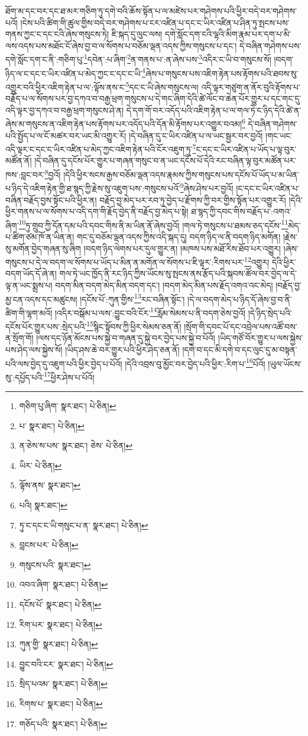 ཐོག་མ་དང་བར་དང་ཐ་མར་གཅིག་ཏུ་དགེ་བའི་ཆོས་སྟོན་པ་ལ་མཛེས་པར་གཤེགས་པའི་ཕྱིར་བདེ་བར་གཤེགས་པའོ། །ངེས་པའི་ཚིག་གི་ཚུལ་གྱིས་བདེ་བར་གཤེགས་པ་ངར་འཛིན་པ་དང་ང་ཡིར་འཛིན་པ་ཤིན་ཏུ་སྤངས་པས་གནས་ཀྱང་ང་དང་ངའི་ཞེས་གསུངས་ཏེ། ཇི་སྐད་དུ་ལུང་ལས། དགེ་སློང་དག་ངའི་ལྷའི་མིག་རྣམ་པར་དག་པ་མི་ལས་འདས་པས་མཐོང་ངོ་ཞེས་བྱ་བ་ལ་སོགས་པ་བཅོམ་ལྡན་འདས་ཀྱིས་གསུངས་པ་དང་། དེ་བཞིན་གཤེགས་པས་དགེ་སློང་དག་ང་ནི་:གཅིག་པུ་\footnote{གཅིག་པུ་ཞིག་  སྣར་ཐང་།  པེ་ཅིན། }དབེན་:པ་ཞིག་\footnote{པ་  སྣར་ཐང་།  པེ་ཅིན། }ན་གནས་པ་:ན་ཞེས་པས་\footnote{ན་ཅེས་ས་པས་  སྣར་ཐང་། ཅེས་  པེ་ཅིན། }འདིར་ང་ཡི་བ་གསུངས་སོ། །བདག་ཉིད་ལ་ང་དང་ང་ཡིར་འཛིན་པ་མེད་ཀྱང་ང་དང་ང་ཡི་\footnote{ཡིར་  པེ་ཅིན། }ཞེས་པ་གསུངས་པས་འཇིག་རྟེན་པས་རྟོགས་པའི་ཐབས་སུ་འགྱུར་བའི་ཕྱིར་འཇིག་རྟེན་པ་ལ་:ལྟོས་ནས་ང་\footnote{ལྟོས་ནས་  སྣར་ཐང་། }དང་ང་ཡི་ཞེས་གསུངས་ལ། འདི་ལྟར་གཙུག་ན་ནོར་བུའི་རྟོགས་པ་བརྗོད་པ་ལ་སོགས་པར་བྱ་དཀའ་བ་བརྒྱ་ཕྲག་གསུངས་པ་དེ་གང་ཞིག་དེའི་ཚེ་ལོང་བ་ཆེན་པོར་གྱུར་པ་དང་གང་དུ་འདི་ལྟར་བྱ་དཀའ་བ་བརྒྱ་ཕྲག་གསུངས་ཤེ་ན། དེ་དག་གོ་བར་འདོད་པའི་འཇིག་རྟེན་པ་ལ་གལ་ཏེ་ང་ཉིད་དེའི་ཚེ་ན་ཞེས་མ་གསུངས་ན་འཇིག་རྟེན་པས་རྟོགས་པར་འདོད་པའི་དོན་མི་རྟོགས་པར་འགྱུར་བའམ།\footnote{པའི།  སྣར་ཐང་། } དེ་བཞིན་གཤེགས་པའི་སྤྱོད་པ་ལ་ངོ་མཚར་བར་ཡང་མི་འགྱུར་རོ། །དེ་བཞིན་དུ་ང་ཡིར་འཛིན་པ་ལ་ཡང་སྦྱར་བར་བྱའོ། །གང་ཡང་འདི་ལྟར་ང་དང་ང་ཡིར་འཛིན་པ་མེད་ཀྱང་འཇིག་རྟེན་པའི་ངོར་འཇུག་ཏུ་\footnote{ཏུ་ང་དང་ང་ཡི་གསུང་པ་ན་  སྣར་ཐང་།  པེ་ཅིན། }ང་དང་ང་ཡིར་འཛིན་པ་ཡོད་པ་ལྟ་བུར་མཚོན་ནོ། །དེ་བཞིན་དུ་དངོས་པོར་གྱུར་པ་གཞན་གསུང་བ་ན་ཡང་དངོས་པོ་དེའི་རང་བཞིན་ལྟ་བུར་མཚོན་པར་ཁས་:བླང་བར་\footnote{བླངས་པར་  པེ་ཅིན། }བྱའོ། །དེའི་ཕྱིར་སངས་རྒྱས་བཅོམ་ལྡན་འདས་རྣམས་ཀྱིས་གསུངས་པས་དངོས་པོ་ཡོད་པ་མ་ཡིན་པ་ཉིད་དེ་འཇིག་རྟེན་གྱི་ཐ་སྙད་ཀྱི་རྗེས་སུ་འཇུག་པས་:གསུངས་པའོ་\footnote{གསུངས་པའི་  སྣར་ཐང་། }ཞེས་ཤེས་པར་བྱའོ། །ང་དང་ང་ཡིར་འཛིན་པ་བཞིན་བརྗོད་བྱས་སྟོང་པའི་ཕྱིར་ན། བརྗོད་བྱ་མེད་པར་རབ་ཏུ་བྱེད་པ་རྫོགས་ཀྱི་བར་གྱིས་སྟོན་པར་འགྱུར་རོ། །དེའི་ཕྱིར་གནས་པ་ལ་སོགས་པ་འདི་དག་གི་རྗོད་བྱེད་ནི་བརྗོད་བྱ་མེད་པ་སྟེ། ཐ་སྙད་ཀྱི་དབང་གིས་བརྗོད་པ་:འགའ་ཞིག་\footnote{འབའ་ཞིག་  སྣར་ཐང་།  པེ་ཅིན། }ཏུ་གྲུབ་ཀྱི་དོན་དམ་པའི་དབང་གིས་ནི་མ་ཡིན་ནོ་ཞེས་བྱའོ། །གལ་ཏེ་གསུངས་པ་ཐམས་ཅད་དངོས་\footnote{དངོས་པོ་  སྣར་ཐང་།  པེ་ཅིན། }མེད་པ་ཚིག་ཙམ་ཁོ་ན་ཡིན་ན། གང་དུ་བཅོམ་ལྡན་འདས་ཀྱིས་འདི་སྐད་དུ། བདག་ཉིད་ལ་ནི་བདག་ཉིད་མགོན། །རྗེས་སུ་མགོན་བྱེད་གཞན་སུ་ཞིག །བདག་ཉིད་ལེགས་པར་དུལ་གྱུར་ན། །མཁས་པས་མཐོ་རིས་ཐོབ་པར་འགྱུར། །ཞེས་གསུངས་པ་དེ་ལ་བདག་ལ་སོགས་པ་ཡོད་པ་མིན་ན་མགོན་ལ་སོགས་པ་ཇི་ལྟར་:རིགས་པར་\footnote{རིག་པར་  སྣར་ཐང་།  པེ་ཅིན། }འགྱུར། དེའི་ཕྱིར་བདག་ཡོད་དོ་ཞེ་ན། གལ་ཏེ་ཡང་ཁྱོད་ནི་རང་ཉིད་ཀྱིས་ཡོངས་སུ་སྤངས་ནས་རྩོད་པའི་སྐབས་ཚོལ་བར་བྱེད་ལ་དེ་ལྟ་ན་ཡང་སྨྲས་པ། བདག་མིན་བདག་མེད་མིན་བདག་དང་། །བདག་མེད་མིན་པས་རྗོད་འགའ་འང་མེད། །བརྗོད་བྱ་མྱ་ངན་འདས་དང་མཚུངས། །དངོས་པོ་:ཀུན་གྱིས་\footnote{ཀུན་གྱི་  སྣར་ཐང་།  པེ་ཅིན། }རང་བཞིན་སྟོང་། །དེ་ལ་བདག་མེད་པ་ཉིད་དོ་ཞེས་བྱ་བ་ནི་ཚིག་གི་ལྷག་མའོ། །འདིར་བསྒོམ་པ་ལས་:བྱུང་བའི་ངོར་\footnote{བྱུང་བའི་ངར་  སྣར་ཐང་།  པེ་ཅིན། }རློམ་སེམས་པ་ནི་བདག་ཅེས་བྱའོ། །དེ་ཉིད་སྲེད་པའི་དངོས་པོར་གྱུར་པས་:སྲེད་པའི་\footnote{སྲིད་པའམ་  སྣར་ཐང་།  པེ་ཅིན། }སྙིང་སྟོབས་ཀྱི་ཕྱིར་སེམས་ཅན་ནོ། །སྲོག་གི་དབང་པོ་དང་འབྲེལ་པས་འཚོ་བས་ན་སྲོག་གོ། །ལས་དང་ཉོན་མོངས་པས་སྐྱེ་བ་གཞན་དུ་སྐྱེ་བར་བྱེད་པས་སྐྱེ་བ་པོའོ། །ཡིད་གཙོ་བོར་གྱུར་པ་ལས་སྐྱེས་པས་ཤེད་ལས་སྐྱེས་སོ། །ཡིད་ཤས་ཆེ་བར་གྱུར་པའི་ཕྱིར་ཤེད་ཅན་ནོ། །དགེ་བ་དང་མི་དགེ་བ་དང་ལུང་དུ་མ་བསྟན་པའི་ལས་བྱེད་དུ་འཇུག་པའི་ཕྱིར་བྱེད་པ་པོའོ། །དེའི་འབྲས་བུ་མྱོང་བར་བྱེད་པའི་ཕྱིར་:རིག་པ་\footnote{རིགས་པ་  སྣར་ཐང་།  པེ་ཅིན། }པོའོ། །ཡུལ་ཡོངས་སུ་:དཔྱོད་པའི་\footnote{གཅོད་པའི་  སྣར་ཐང་།  པེ་ཅིན། }ཕྱིར་ཤེས་པ་པོའོ། 